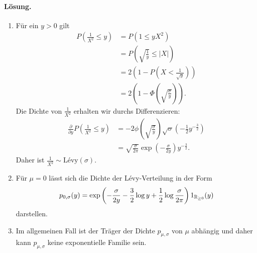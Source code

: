 \paragraph*{Lösung.} 
\begin{enumerate}
    \item Für ein $y>0$ gilt
        \begin{align*}
            P \left( \frac{1}{X^{2}} \leq y \right) &= P \left( 1 \leq y X^{2}   \right) \\
            &= P \left( \sqrt{\frac{1}{y}} \leq | X | \right) \\
            &= 2 \left( 1 - P \left( X < \frac{1}{\sqrt{y}} \right) \right) \\
            &= 2 \left( 1 - \Phi\left( \sqrt{ \frac{\sigma}{y}} \right) \right).
        \end{align*}
        Die Dichte von $\frac{1}{X^2}$ erhalten wir durchs Differenzieren:
        \begin{align*}
            \frac{\partial}{\partial y} P \left( \frac{1}{X^2} \leq y \right) &=
            -2 \phi \left( \sqrt{\frac{\sigma}{y}} \right) \sqrt{\sigma} 
            \left( -\frac{1}{2} y^{-\frac{3}{2}} \right) \\
            &= \sqrt{\frac{\sigma}{2 \pi}} \exp \left( - \frac{\sigma}{2 y} \right) y^{-\frac{3}{2}}.
        \end{align*}
        Daher ist $\frac{1}{X^2} \sim \text{L\'evy}(\sigma)$.

    \item Für $\mu=0$ lässt sich die Dichte der L\'evy-Verteilung in der Form
        \begin{equation*}
            p_{0,\sigma}(y) = \exp \left( -\frac{\sigma}{2y} - \frac{3}{2}\log y 
            + \frac{1}{2} \log \frac{\sigma}{2 \pi}  \right) 1_{\mathbb R_{\geq 0}} (y)
        \end{equation*}
        darstellen.

    \item Im allgemeinen Fall ist der Träger der Dichte $p_{\mu,\sigma}$ von $\mu$ abhängig und daher
        kann $p_{\mu,\sigma}$ keine exponentielle Familie sein.

\end{enumerate}






